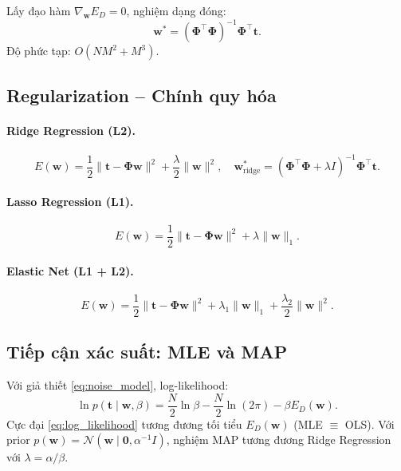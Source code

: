 \documentclass[12pt, a4paper]{article}
\begin{document}
Lấy đạo hàm $\nabla_{\mathbf{w}} E_D = 0$, nghiệm dạng đóng:
\begin{equation}
  \mathbf{w}^* = (\boldsymbol{\Phi}^\top \boldsymbol{\Phi})^{-1} \boldsymbol{\Phi}^\top \mathbf{t}.
  \label{eq:normal_eq}
\end{equation}
Độ phức tạp: $O(NM^2 + M^3)$.

\subsection{Regularization -- Chính quy hóa}

\paragraph{Ridge Regression (L2).}
\begin{equation}
  E(\mathbf{w}) = \frac{1}{2}\|\mathbf{t} - \boldsymbol{\Phi}\mathbf{w}\|^2
                + \frac{\lambda}{2}\|\mathbf{w}\|^2,
  \quad
  \mathbf{w}^*_{\text{ridge}} = (\boldsymbol{\Phi}^\top\boldsymbol{\Phi} + \lambda I)^{-1}
                                  \boldsymbol{\Phi}^\top\mathbf{t}.
  \label{eq:ridge}
\end{equation}

\paragraph{Lasso Regression (L1).}
\begin{equation}
  E(\mathbf{w}) = \frac{1}{2}\|\mathbf{t} - \boldsymbol{\Phi}\mathbf{w}\|^2
                + \lambda\|\mathbf{w}\|_1.
  \label{eq:lasso}
\end{equation}

\paragraph{Elastic Net (L1 + L2).}
\begin{equation}
  E(\mathbf{w}) = \frac{1}{2}\|\mathbf{t} - \boldsymbol{\Phi}\mathbf{w}\|^2
                + \lambda_1\|\mathbf{w}\|_1
                + \frac{\lambda_2}{2}\|\mathbf{w}\|^2.
  \label{eq:elasticnet}
\end{equation}

\subsection{Tiếp cận xác suất: MLE và MAP}

Với giả thiết \eqref{eq:noise_model}, log-likelihood:
\begin{equation}
  \ln p(\mathbf{t} \mid \mathbf{w}, \beta)
  = \frac{N}{2}\ln\beta - \frac{N}{2}\ln(2\pi) - \beta E_D(\mathbf{w}).
  \label{eq:log_likelihood}
\end{equation}
Cực đại \eqref{eq:log_likelihood} tương đương tối tiểu $E_D(\mathbf{w})$
(MLE $\equiv$ OLS). Với prior $p(\mathbf{w}) = \mathcal{N}(\mathbf{w} \mid \mathbf{0}, \alpha^{-1}I)$,
nghiệm MAP tương đương Ridge Regression với $\lambda = \alpha/\beta$.
\end{document}
